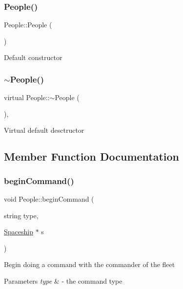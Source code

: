 \subsubsection{\texorpdfstring{People()}{People()}}
{\footnotesize\ttfamily People\+::\+People (\begin{DoxyParamCaption}{ }\end{DoxyParamCaption})\hspace{0.3cm}{\ttfamily [inline]}}

Default constructor \mbox{\label{classPeople_a26b0c041fafa38a1f84e0d51742e886a}} 
\subsubsection{\texorpdfstring{$\sim$\+People()}{~People()}}
{\footnotesize\ttfamily virtual People\+::$\sim$\+People (\begin{DoxyParamCaption}{ }\end{DoxyParamCaption})\hspace{0.3cm}{\ttfamily [inline]}, {\ttfamily [virtual]}}

Virtual default desctructor 

\subsection{Member Function Documentation}
\mbox{\label{classPeople_abf8a17cdc24354a5163d212a77312873}} 
\subsubsection{\texorpdfstring{begin\+Command()}{beginCommand()}}
{\footnotesize\ttfamily void People\+::begin\+Command (\begin{DoxyParamCaption}\item[{string}]{type,  }\item[{\hyperlink{classSpaceship}{Spaceship} $\ast$}]{s }\end{DoxyParamCaption})}

Begin doing a command with the commander of the fleet 
\begin{DoxyParams}{Parameters}
{\em type} & -\/ the command type \\
\hline
\end{DoxyParams}
\mbox{\label{classPeople_a66c99da939fe89614360953a3619a271}} 
